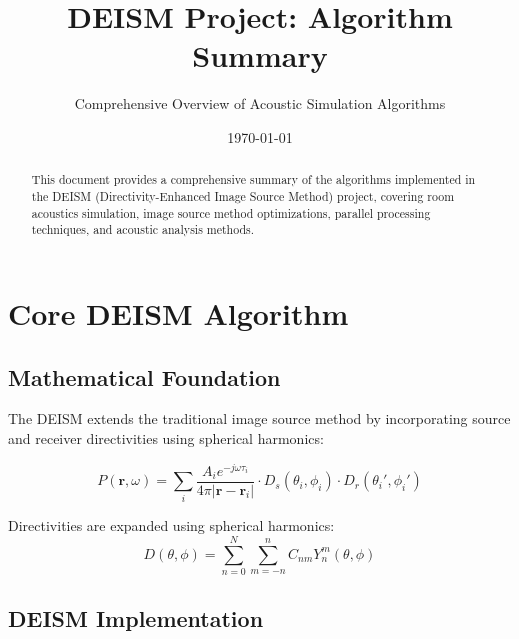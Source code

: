 \documentclass[11pt,a4paper]{article}
\title{\textbf{DEISM Project: Algorithm Summary}}
\author{Comprehensive Overview of Acoustic Simulation Algorithms}
\date{\today}
\begin{document}
\maketitle

\begin{abstract}
This document provides a comprehensive summary of the algorithms implemented in the DEISM (Directivity-Enhanced Image Source Method) project, covering room acoustics simulation, image source method optimizations, parallel processing techniques, and acoustic analysis methods.
\end{abstract}

\tableofcontents
\newpage

\section{Core DEISM Algorithm}

\subsection{Mathematical Foundation}

The DEISM extends the traditional image source method by incorporating source and receiver directivities using spherical harmonics:

\begin{equation}
P(\mathbf{r}, \omega) = \sum_{i} \frac{A_i e^{-j\omega\tau_i}}{4\pi|\mathbf{r} - \mathbf{r}_i|} \cdot D_s(\theta_i, \phi_i) \cdot D_r(\theta_i', \phi_i')
\end{equation}

Directivities are expanded using spherical harmonics:
\begin{equation}
D(\theta, \phi) = \sum_{n=0}^{N} \sum_{m=-n}^{n} C_{nm} Y_n^m(\theta, \phi)
\end{equation}

\subsection{DEISM Implementation}
\end{document}
